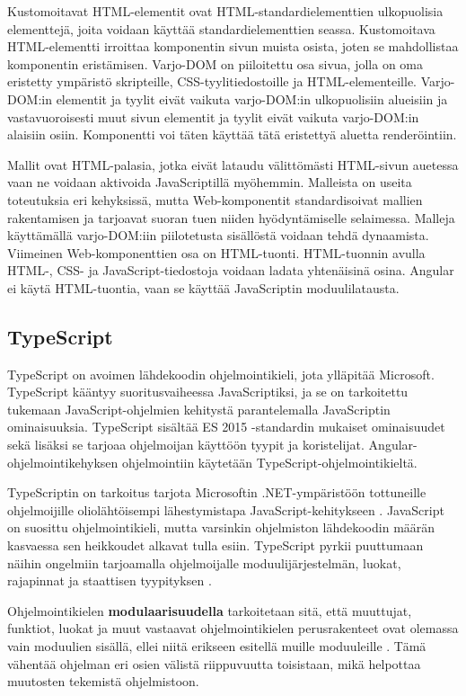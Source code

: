 \documentclass[utf8]{gradu3}
\begin{document}
Kustomoitavat HTML-elementit ovat HTML-standardielementtien ulkopuolisia elementtejä, joita voidaan käyttää standardielementtien seassa. Kustomoitava HTML-elementti irroittaa komponentin sivun muista osista, joten se mahdollistaa komponentin eristämisen. Varjo-DOM on piiloitettu osa sivua, jolla on oma eristetty ympäristö skripteille, CSS-tyylitiedostoille ja HTML-elementeille. Varjo-DOM:in elementit ja tyylit eivät vaikuta varjo-DOM:in ulkopuolisiin alueisiin ja vastavuoroisesti muut sivun elementit ja tyylit eivät vaikuta varjo-DOM:in alaisiin osiin. Komponentti voi täten käyttää tätä eristettyä aluetta renderöintiin. 

Mallit ovat HTML-palasia, jotka eivät lataudu välittömästi HTML-sivun auetessa vaan ne voidaan aktivoida JavaScriptillä myöhemmin. Malleista on useita toteutuksia eri kehyksissä, mutta Web-komponentit standardisoivat mallien rakentamisen ja tarjoavat suoran tuen niiden hyödyntämiselle selaimessa. Malleja käyttämällä varjo-DOM:iin piilotetusta sisällöstä voidaan tehdä dynaamista. Viimeinen Web-komponenttien osa on HTML-tuonti. HTML-tuonnin avulla HTML-, CSS- ja JavaScript-tiedostoja voidaan ladata yhtenäisinä osina. Angular ei käytä HTML-tuontia, vaan se käyttää JavaScriptin moduulilatausta. \parencite[]{angular-6-by-example}

\subsection{TypeScript}

TypeScript on avoimen lähdekoodin ohjelmointikieli, jota ylläpitää Microsoft. TypeScript kääntyy suoritusvaiheessa JavaScriptiksi, ja se on tarkoitettu tukemaan JavaScript-ohjelmien kehitystä parantelemalla JavaScriptin ominaisuuksia. TypeScript sisältää ES 2015 -standardin mukaiset ominaisuudet sekä lisäksi se tarjoaa ohjelmoijan käyttöön tyypit ja koristelijat. Angular-ohjelmointikehyksen ohjelmointiin käytetään TypeScript-ohjelmointikieltä.

TypeScriptin on tarkoitus tarjota Microsoftin .NET-ympäristöön tottuneille ohjelmoijille oliolähtöisempi lähestymistapa JavaScript-kehitykseen \parencite[]{maharry-typescript}. JavaScript on suosittu ohjelmointikieli, mutta varsinkin ohjelmiston lähdekoodin määrän kasvaessa sen heikkoudet alkavat tulla esiin. TypeScript pyrkii puuttumaan näihin ongelmiin tarjoamalla ohjelmoijalle moduulijärjestelmän, luokat, rajapinnat ja staattisen tyypityksen \parencite[]{understanding-typescript}.

Ohjelmointikielen \textbf{modulaarisuudella} tarkoitetaan sitä, että muuttujat, funktiot, luokat ja muut vastaavat ohjelmointikielen perusrakenteet ovat olemassa vain moduulien sisällä, ellei niitä erikseen esitellä muille moduuleille \parencite[]{typescript-modules}. Tämä vähentää ohjelman eri osien välistä riippuvuutta toisistaan, mikä helpottaa muutosten tekemistä ohjelmistoon.
\end{document}
